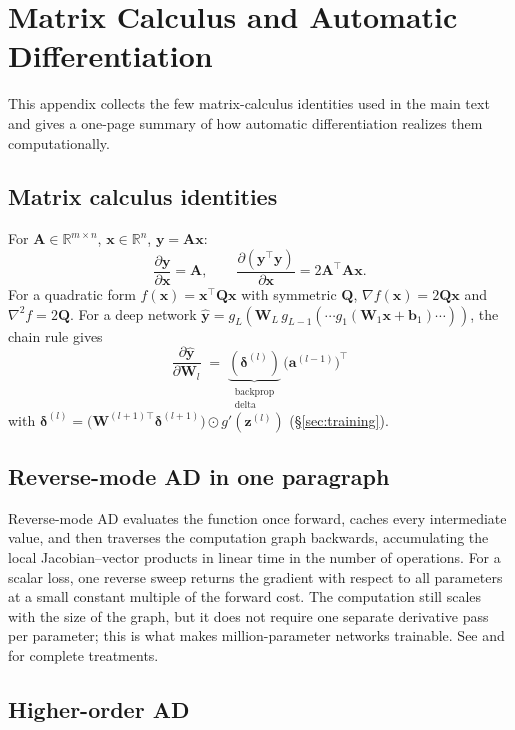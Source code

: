 \documentclass[11pt,a4paper]{report}
\newcommand{\R}{\mathbb{R}}
\begin{document}
\chapter{Matrix Calculus and Automatic Differentiation}
\label{app:ad}

This appendix collects the few matrix-calculus identities used in the main text and gives a one-page summary of how automatic differentiation realizes them computationally.

\section{Matrix calculus identities}

For $\bm A \in \R^{m\times n}$, $\bm x \in \R^n$, $\bm y = \bm A\bm x$:
\[
   \frac{\partial \bm y}{\partial \bm x} = \bm A,\qquad
   \frac{\partial (\bm y^\top \bm y)}{\partial \bm x} = 2\bm A^\top \bm A\bm x.
\]
For a quadratic form $f(\bm x) = \bm x^\top \bm Q \bm x$ with symmetric $\bm Q$,
$\nabla f(\bm x) = 2\bm Q\bm x$ and $\nabla^2 f = 2\bm Q$.
For a deep network $\bm{\hat y} = g_L(\bm W_L\, g_{L-1}(\cdots g_1(\bm W_1 \bm x + \bm b_1)\cdots))$, the chain rule gives
\[
   \frac{\partial \bm{\hat y}}{\partial \bm W_l}
   \;=\;
   \underbrace{(\bm \delta^{(l)})}_{\substack{\text{backprop} \\ \text{delta}}}
   \,\bigl(\bm a^{(l-1)}\bigr)^{\!\top}
\]
with $\bm \delta^{(l)} = \bigl(\bm W^{(l+1)\top}\bm \delta^{(l+1)}\bigr) \odot g'(\bm z^{(l)})$ (\S\ref{sec:training}).

\section{Reverse-mode AD in one paragraph}

Reverse-mode AD evaluates the function once forward, caches every intermediate value, and then traverses the computation graph backwards, accumulating the local Jacobian--vector products in linear time in the number of operations.  For a scalar loss, one reverse sweep returns the gradient with respect to all parameters at a small constant multiple of the forward cost.  The computation still scales with the size of the graph, but it does not require one separate derivative pass per parameter; this is what makes million-parameter networks trainable.  See \citet{baydin2018automatic} and \citet{margossian2019review} for complete treatments.

\section{Higher-order AD}
\end{document}
